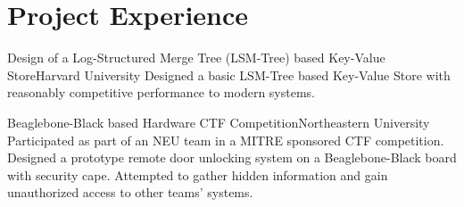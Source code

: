 \section{Project Experience}

{Design of a Log-Structured Merge Tree (LSM-Tree) based Key-Value Store}{Harvard
University}{}
{ Designed a basic LSM-Tree based Key-Value Store with reasonably competitive
performance to modern systems. \\
}

{Beaglebone-Black based Hardware CTF Competition}{Northeastern
University}{}
{ Participated as part of an NEU team in a MITRE sponsored CTF competition. Designed a prototype
  remote door unlocking system on a Beaglebone-Black board with security cape. Attempted to
  gather hidden information and gain unauthorized access to other teams' systems. \\
}
